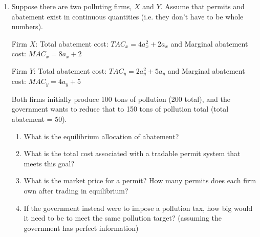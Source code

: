 \documentclass[11pt]{article}
\newcommand{\answer}[1]{\iftoggle{INCLUDEANSWERS}{{\color{violet!70!white}\textbf{Solution:} #1}}{}}
\newcommand{\points}[1]{\iftoggle{INCLUDEPOINTS}{{\color{blue!70!white}(#1 pts.)}}{}}
\begin{document}
\begin{enumerate}


  \item Suppose there are two polluting firms, $X$ and $Y$. Assume that permits and abatement exist in continuous quantities (i.e. they don’t have to be whole numbers).

  Firm $X$: Total abatement cost: $TAC_x = 4a_x^2 + 2a_x$ and Marginal abatement cost: $MAC_x = 8a_x + 2$

  Firm $Y$: Total abatement cost: $TAC_y = 2a_y^2 + 5a_y$ and Marginal abatement cost: $MAC_y = 4a_y + 5$
  
  
  Both firms initially produce 100 tons of pollution (200 total), and the government wants to reduce that to 150 tons of pollution total (total abatement = 50).

  \begin{enumerate}
    \item \points{10} What is the equilibrium allocation of abatement?
    \item \points{5} What is the total cost associated with a tradable permit system that meets this goal?
    \item \points{5} What is the market price for a permit? How many permits does each firm own after trading in equilibrium?
    \item \points{10} If the government instead were to impose a pollution tax, how big would it need to be to meet the same pollution target? (assuming the government has perfect information)
  \end{enumerate}

  \answer{
    \begin{enumerate}
      \item $a_x + a_y = 50$ and $8a_x + 2 = 4a_y + 5$. Putting them together yields: 
      $$
        8a_x + 2 = 200 - 4a_x + 5 \implies a_x^* = 203/12
      $$
      and $a_y^* = 397/12$.

      \item $TAC = TAC_x + TAC_y = 4 (203/12)^2 + 2 (203/12) + 2 (397/12)^2 + 5 (397/12) \approx \$3533$
      

\end{enumerate}}
\end{enumerate}
\end{document}
